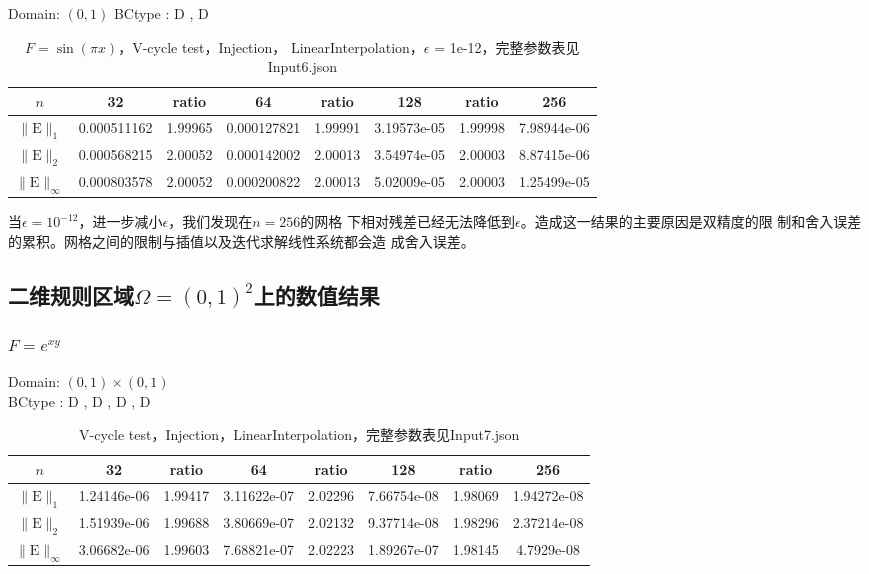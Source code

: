 \documentclass[a4paper,twoside]{ctexart}
\begin{document}
\noindent Domain: $(0,1)$
BCtype : D , D
\begin{table}[htbp]
\centering\begin{tabular}{c|ccccccc}
\hline
$n$&32&ratio&64&ratio&128&ratio&256\\
\hline
$\|\mathrm{E}\|_1$&0.000511162&1.99965&0.000127821&1.99991&3.19573e-05&1.99998&7.98944e-06\\
\hline
$\|\mathrm{E}\|_2$&0.000568215&2.00052&0.000142002&2.00013&3.54974e-05&2.00003&8.87415e-06\\
\hline
$\|\mathrm{E}\|_{\infty}$&0.000803578&2.00052&0.000200822&2.00013&5.02009e-05&2.00003&1.25499e-05\\
\hline
\end{tabular}
\caption{$F = \sin(\pi x)$，V-cycle test，Injection，
  LinearInterpolation，$\epsilon$ = 1e-12，完整参数表见Input6.json}
\end{table}

当$\epsilon = 10^{-12}$，进一步减小$\epsilon$，我们发现在$n=256$的网格
下相对残差已经无法降低到$\epsilon$。造成这一结果的主要原因是双精度的限
制和舍入误差的累积。网格之间的限制与插值以及迭代求解线性系统都会造
成舍入误差。
\newpage
\subsection{二维规则区域$\Omega=(0,1)^2$上的数值结果}
\subsubsection{$F=e^{xy}$}

\noindent Domain: $(0,1)\times(0,1)$\\
BCtype : D , D , D , D
\begin{table}[htbp]
\centering\begin{tabular}{c|ccccccc}
\hline
$n$&32&ratio&64&ratio&128&ratio&256\\
\hline
$\|\mathrm{E}\|_1$&1.24146e-06&1.99417&3.11622e-07&2.02296&7.66754e-08&1.98069&1.94272e-08\\
\hline
$\|\mathrm{E}\|_2$&1.51939e-06&1.99688&3.80669e-07&2.02132&9.37714e-08&1.98296&2.37214e-08\\
\hline
$\|\mathrm{E}\|_{\infty}$&3.06682e-06&1.99603&7.68821e-07&2.02223&1.89267e-07&1.98145&4.7929e-08\\
\hline
\end{tabular}
\caption{V-cycle test，Injection，LinearInterpolation，完整参数表见Input7.json}
\end{table}
\end{document}
